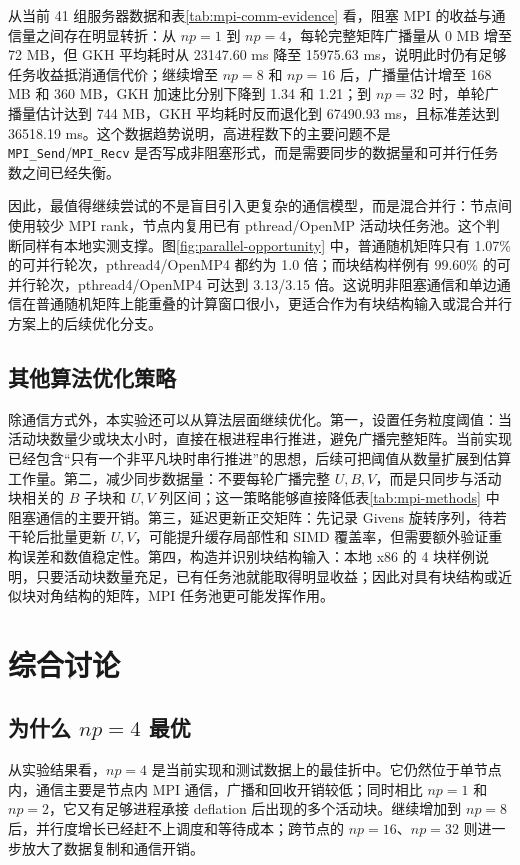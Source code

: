 \documentclass[UTF8,a4paper,10pt,fontset=windows]{ctexart}
\begin{document}
从当前 41 组服务器数据和表\ref{tab:mpi-comm-evidence} 看，阻塞 MPI 的收益与通信量之间存在明显转折：从 $np=1$ 到 $np=4$，每轮完整矩阵广播量从 0 MB 增至 72 MB，但 GKH 平均耗时从 23147.60 ms 降至 15975.63 ms，说明此时仍有足够任务收益抵消通信代价；继续增至 $np=8$ 和 $np=16$ 后，广播量估计增至 168 MB 和 360 MB，GKH 加速比分别下降到 1.34 和 1.21；到 $np=32$ 时，单轮广播量估计达到 744 MB，GKH 平均耗时反而退化到 67490.93 ms，且标准差达到 36518.19 ms。这个数据趋势说明，高进程数下的主要问题不是 \texttt{MPI\_Send}/\texttt{MPI\_Recv} 是否写成非阻塞形式，而是需要同步的数据量和可并行任务数之间已经失衡。

因此，最值得继续尝试的不是盲目引入更复杂的通信模型，而是混合并行：节点间使用较少 MPI rank，节点内复用已有 pthread/OpenMP 活动块任务池。这个判断同样有本地实测支撑。图\ref{fig:parallel-opportunity} 中，普通随机矩阵只有 1.07\% 的可并行轮次，pthread4/OpenMP4 都约为 1.0 倍；而块结构样例有 99.60\% 的可并行轮次，pthread4/OpenMP4 可达到 3.13/3.15 倍。这说明非阻塞通信和单边通信在普通随机矩阵上能重叠的计算窗口很小，更适合作为有块结构输入或混合并行方案上的后续优化分支。

\subsection{其他算法优化策略}
除通信方式外，本实验还可以从算法层面继续优化。第一，设置任务粒度阈值：当活动块数量少或块太小时，直接在根进程串行推进，避免广播完整矩阵。当前实现已经包含“只有一个非平凡块时串行推进”的思想，后续可把阈值从数量扩展到估算工作量。第二，减少同步数据量：不要每轮广播完整 $U,B,V$，而是只同步与活动块相关的 $B$ 子块和 $U,V$ 列区间；这一策略能够直接降低表\ref{tab:mpi-methods} 中阻塞通信的主要开销。第三，延迟更新正交矩阵：先记录 Givens 旋转序列，待若干轮后批量更新 $U,V$，可能提升缓存局部性和 SIMD 覆盖率，但需要额外验证重构误差和数值稳定性。第四，构造并识别块结构输入：本地 x86 的 4 块样例说明，只要活动块数量充足，已有任务池就能取得明显收益；因此对具有块结构或近似块对角结构的矩阵，MPI 任务池更可能发挥作用。

\section{综合讨论}

\subsection{为什么 $np=4$ 最优}
从实验结果看，$np=4$ 是当前实现和测试数据上的最佳折中。它仍然位于单节点内，通信主要是节点内 MPI 通信，广播和回收开销较低；同时相比 $np=1$ 和 $np=2$，它又有足够进程承接 deflation 后出现的多个活动块。继续增加到 $np=8$ 后，并行度增长已经赶不上调度和等待成本；跨节点的 $np=16$、$np=32$ 则进一步放大了数据复制和通信开销。
\end{document}
